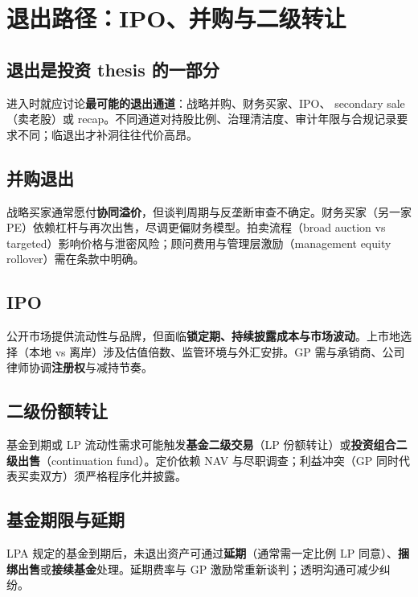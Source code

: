 \chapter{退出路径：IPO、并购与二级转让}

\section{退出是投资 thesis 的一部分}

进入时就应讨论\textbf{最可能的退出通道}：战略并购、财务买家、IPO、 secondary sale（卖老股）或 recap。不同通道对持股比例、治理清洁度、审计年限与合规记录要求不同；临退出才补洞往往代价高昂。

\section{并购退出}

战略买家通常愿付\textbf{协同溢价}，但谈判周期与反垄断审查不确定。财务买家（另一家 PE）依赖杠杆与再次出售，尽调更偏财务模型。拍卖流程（broad auction vs targeted）影响价格与泄密风险；顾问费用与管理层激励（management equity rollover）需在条款中明确。

\section{IPO}

公开市场提供流动性与品牌，但面临\textbf{锁定期、持续披露成本与市场波动}。上市地选择（本地 vs 离岸）涉及估值倍数、监管环境与外汇安排。GP 需与承销商、公司律师协调\textbf{注册权}与减持节奏。

\section{二级份额转让}

基金到期或 LP 流动性需求可能触发\textbf{基金二级交易}（LP 份额转让）或\textbf{投资组合二级出售}（continuation fund）。定价依赖 NAV 与尽职调查；利益冲突（GP 同时代表买卖双方）须严格程序化并披露。

\section{基金期限与延期}

LPA 规定的基金到期后，未退出资产可通过\textbf{延期}（通常需一定比例 LP 同意）、\textbf{捆绑出售}或\textbf{接续基金}处理。延期费率与 GP 激励常重新谈判；透明沟通可减少纠纷。
